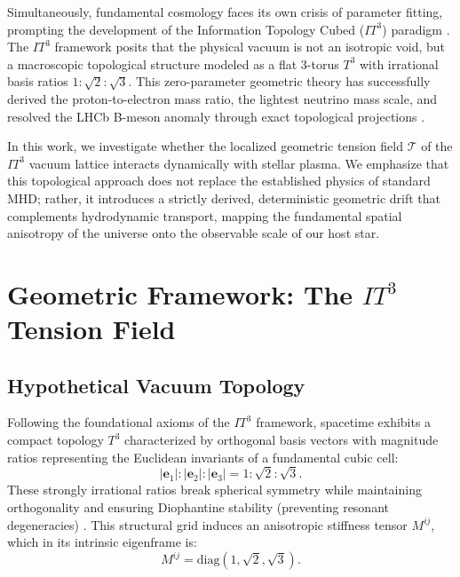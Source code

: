 \documentclass[aps, prd, onecolumn, 11pt, longbibliography, amsmath, amssymb]{revtex4-2}
\begin{document}
Simultaneously, fundamental cosmology faces its own crisis of parameter fitting, prompting the development of the Information Topology Cubed ($IT^3$) paradigm \cite{Logvinovich26_IT3}. The $IT^3$ framework posits that the physical vacuum is not an isotropic void, but a macroscopic topological structure modeled as a flat 3-torus $T^3$ with irrational basis ratios $1:\sqrt{2}:\sqrt{3}$. This zero-parameter geometric theory has successfully derived the proton-to-electron mass ratio, the lightest neutrino mass scale, and resolved the LHCb B-meson anomaly through exact topological projections \cite{Logvinovich26_Wboson}.

In this work, we investigate whether the localized geometric tension field $\mathcal{T}$ of the $IT^3$ vacuum lattice interacts dynamically with stellar plasma. We emphasize that this topological approach does not replace the established physics of standard MHD; rather, it introduces a strictly derived, deterministic geometric drift that complements hydrodynamic transport, mapping the fundamental spatial anisotropy of the universe onto the observable scale of our host star.

\section{Geometric Framework: The $IT^3$ Tension Field}

\subsection{Hypothetical Vacuum Topology}

Following the foundational axioms of the $IT^3$ framework, spacetime exhibits a compact topology $T^3$ characterized by orthogonal basis vectors with magnitude ratios representing the Euclidean invariants of a fundamental cubic cell:
\begin{equation}
|\mathbf{e}_1| : |\mathbf{e}_2| : |\mathbf{e}_3| = 1 : \sqrt{2} : \sqrt{3}.
\label{eq:basis}
\end{equation}
These strongly irrational ratios break spherical symmetry while maintaining orthogonality and ensuring Diophantine stability (preventing resonant degeneracies) \cite{Logvinovich26_IT3}. This structural grid induces an anisotropic stiffness tensor $M^{ij}$, which in its intrinsic eigenframe is:
\begin{equation}
M^{ij} = \mathrm{diag}(1, \sqrt{2}, \sqrt{3}).
\label{eq:stiffness}
\end{equation}
\end{document}
